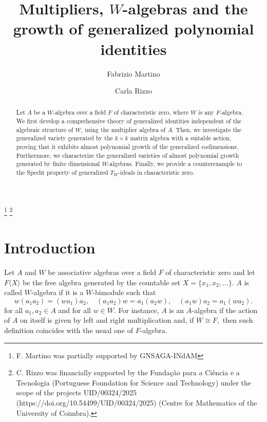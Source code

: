 \documentclass[reqno]{amsart}
\theoremstyle{definition}
\numberwithin{equation}{section}
\numberwithin{theorem}{section}
\newcommand{\F}{F\langle X\rangle}
\begin{document}
\title{Multipliers, $W$-algebras and the growth of generalized polynomial identities}

\author{Fabrizio Martino}
\address{Fabrizio Martino, Dipartimento di Matematica e Informatica, Universit\`a degli Studi di Palermo, Via Archirafi 34, 90123, Palermo, Italy.}

\author{Carla Rizzo}
\address{Carla Rizzo, CMUC, Department of Mathematics, University of Coimbra, 3000-143
Coimbra, Portugal.}


\thanks{F. Martino was partially supported by GNSAGA-INdAM}
\thanks{C. Rizzo was financially supported by the Fundação para a Ciência e a Tecnologia (Portuguese Foundation for Science and Technology) under the scope of the projects UID/00324/2025 (https://doi.org/10.54499/UID/00324/2025) (Centre for Mathematics of the University of Coimbra).}






\begin{abstract}
Let $A$ be a $W$-algebra over a field $F$ of characteristic zero, where $W$ is any $F$-algebra. We first develop a comprehensive theory of generalized identities independent of the algebraic structure of $W$, using the multiplier algebra of $A.$ Then, we investigate the generalized variety generated by the $k\times k$ matrix algebra with a suitable action, proving that it exhibits almost polynomial growth of the generalized codimensions. Furthermore, we characterize the generalized varieties of almost polynomial growth generated by finite dimensional $W$-algebras. Finally, we provide a counterexample to the Specht property of generalized $T_W$-ideals in characteristic zero.
\end{abstract}

\maketitle

\section{Introduction}
Let $A$ and $W$ be associative algebras over a field $F$ of characteristic zero and let $\F$ be the free algebra generated by the countable set $X=\{x_1,x_2,\ldots\}.$ $A$ is called $W$-algebra if it is a $W$-bimodule such that
\begin{equation*}
		w(a_1 a_2)=(wa_1)a_2, \quad  (a_1 a_2)w=a_1(a_2 w), \quad (a_1 w) a_2= a_1 (w a_2).
	\end{equation*}
for all $a_1,a_2\in A$ and for all $w\in W.$ For instance, $A$ is an $A$-algebra if the action of $A$ on itself is given by left and right multiplication and, if $W\cong F,$ then such definition coincides with the usual one of $F$-algebra.
\end{document}
